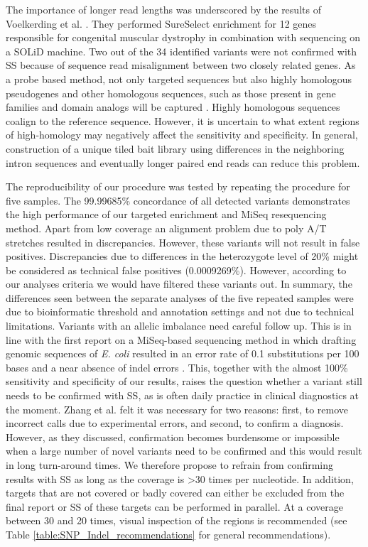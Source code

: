 The importance of longer read lengths was underscored by the results of Voelkerding et al. \cite{Voelkerding_2010}. 
They performed SureSelect enrichment for 12 genes responsible for congenital muscular dystrophy in combination with sequencing on a SOLiD machine. 
Two out of the 34 identified variants were not confirmed with SS because of sequence read misalignment between two closely related genes. 
As a probe based method, not only targeted sequences but also highly homologous pseudogenes and other homologous sequences, such as those present in gene families and domain analogs will be captured \cite{Coonrod_2012}. 
Highly homologous sequences coalign to the reference sequence. 
However, it is uncertain to what extent regions of high-homology may negatively affect the sensitivity and specificity. 
In general, construction of a unique tiled bait library using differences in the neighboring intron sequences and eventually longer paired end reads can reduce this problem. 

The reproducibility of our procedure was tested by repeating the procedure for five samples. 
The 99.99685\% concordance of all detected variants demonstrates the high performance of our targeted enrichment and MiSeq resequencing method. 
Apart from low coverage an alignment problem due to poly A/T stretches resulted in discrepancies. 
However, these variants will not result in false positives. 
Discrepancies due to differences in the heterozygote level of 20\% might be considered as technical false positives (0.0009269\%). 
However, according to our analyses criteria we would have filtered these variants out. 
In summary, the differences seen between the separate analyses of the five repeated samples were due to bioinformatic threshold and annotation settings and not due to technical limitations. 
Variants with an allelic imbalance need careful follow up. 
This is in line with the first report on a MiSeq-based sequencing method in which drafting genomic sequences of \textsl{E. coli} resulted in an error rate of 0.1 substitutions per 100 bases and a near absence of indel errors \cite{Loman_2012}. 
This, together with the almost 100\% sensitivity and specificity of our results, raises the question whether a variant still needs to be confirmed with SS, as is often daily practice in clinical diagnostics at the moment. Zhang et al. \cite{Zhang_2012} felt it was necessary for two reasons: first, to remove incorrect calls due to experimental errors, and second, to confirm a diagnosis. 
However, as they discussed, confirmation becomes burdensome or impossible when a large number of novel variants need to be confirmed and this would result in long turn-around times. 
We therefore propose to refrain from confirming results with SS as long as the coverage is {\textgreater}30 times per nucleotide. 
In addition, targets that are not covered or badly covered can either be excluded from the final report or SS of these targets can be performed in parallel. 
At a coverage between 30 and 20 times, visual inspection of the regions is recommended (see Table \ref{table:SNP_Indel_recommendations} for general recommendations).

